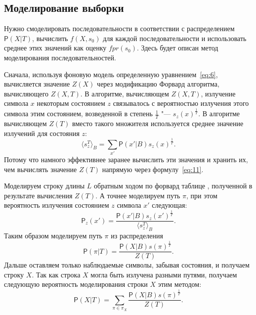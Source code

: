 \documentclass[specialist,
substylefile = spbu_report.rtx,
subf,href,colorlinks=true, 12pt]{disser}
\begin{document}
			\subsection{Моделирование выборки}
				Нужно смоделировать последовательности в соответствии с распределением $\mathsf{P}(X|T)$, вычислить $f(X, s_{0})$ для каждой последовательности и использовать среднее этих значений как оценку $fpr(s_{0})$. Здесь будет описан метод моделирования последовательностей.
				
				Сначала, используя фоновую модель определенную уравнением~\eqref{eq:6}, вычисляется значение $Z(X)$ через модификацию Форвард алгоритма, вычисляющего $Z(X,T)$. В алгоритме, вычисляющем $Z(X,T)$, излучение символа $x$ некоторым состоянием $z$ связывалось с вероятностью излучения этого символа этим состоянием, возведенной в степень $\frac{1}{T}$ "--- $s_{z}(x)^{\frac{1}{T}}$. В алгоритме вычисляющем $Z(T)$ вместо такого множителя используется среднее значение излучений для состояния $z$:
				\begin{equation*}
					\langle s_{z}^{T} \rangle_{B} = \sum_{x'}\mathsf{P}(x'|B)s_{z}(x)^{\frac{1}{T}}. 
					\label{eq:13}
				\end{equation*}					
				Потому что намного эффективнее заранее вычислить эти значения и хранить их, чем вычислять значение $Z(T)$ напрямую через формулу~\eqref{eq:11}.
				
				Моделируем строку длины $L$ обратным ходом по форвард таблице \cite{Compeau2015a}, полученной в результате вычисления $Z(T)$. А точнее моделируем путь $\pi$, при этом вероятность излучения состоянием $z$ символа $x'$ следующая:
				\begin{equation*}
					\mathsf{P}_{z}(x') = \frac{\mathsf{P}(x'|B)s_{z}(x')^{\frac{1}{T}}} {\langle s_{z}^{T} \rangle_{B}}. 
					\label{eq:14}
				\end{equation*}			
				Таким образом моделируем путь $\pi$ из распределения 
				\begin{equation*}
					\mathsf{P}(\pi|T) = \frac{\mathsf{P}(X|B)s(\pi)^{\frac{1}{T}}}{Z(T)}. 
					\label{eq:15}
				\end{equation*}
				Дальше оставляем только наблюдаемые символы, забывая состояния, и получаем строку $X$. Так как строка $X$ могла быть излучена разными путями, получаем следующую вероятность моделирования строки $X$ этим методом:
				\begin{equation*}				
					\mathsf{P}(X|T) = \sum_{\pi \in \pi_{X}} \frac{\mathsf{P}(X|B)s(\pi)^{\frac{1}{T}}}{Z(T)}. 
					\label{eq:16}
				\end{equation*}	
			
\end{document}
